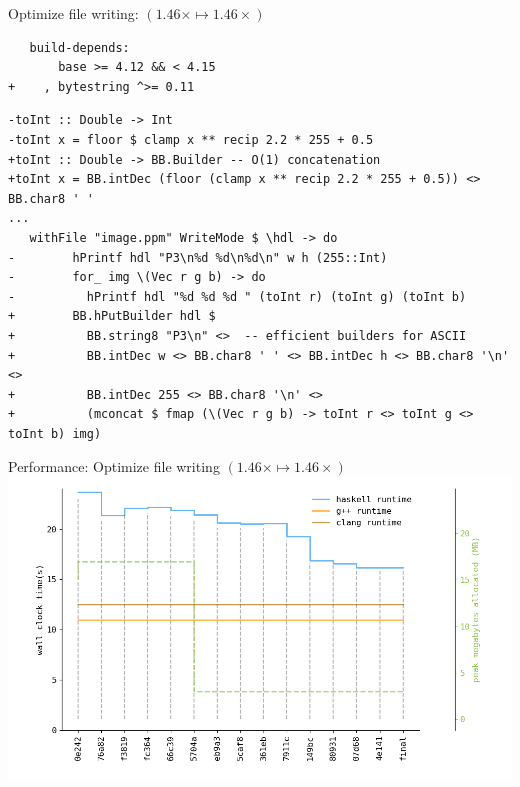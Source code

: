 \documentclass[8pt]{beamer}
\begin{document}
\begin{frame}[fragile]{Optimize file writing: $(1.46\times \mapsto 1.46\times)$}
\begin{verbatim}
   build-depends:
       base >= 4.12 && < 4.15
+    , bytestring ^>= 0.11
\end{verbatim}
\begin{verbatim}
-toInt :: Double -> Int
-toInt x = floor $ clamp x ** recip 2.2 * 255 + 0.5
+toInt :: Double -> BB.Builder -- O(1) concatenation
+toInt x = BB.intDec (floor (clamp x ** recip 2.2 * 255 + 0.5)) <> BB.char8 ' '
... 
   withFile "image.ppm" WriteMode $ \hdl -> do
-        hPrintf hdl "P3\n%d %d\n%d\n" w h (255::Int)
-        for_ img \(Vec r g b) -> do
-          hPrintf hdl "%d %d %d " (toInt r) (toInt g) (toInt b)
+        BB.hPutBuilder hdl $
+          BB.string8 "P3\n" <>  -- efficient builders for ASCII
+          BB.intDec w <> BB.char8 ' ' <> BB.intDec h <> BB.char8 '\n' <>
+          BB.intDec 255 <> BB.char8 '\n' <>
+          (mconcat $ fmap (\(Vec r g b) -> toInt r <> toInt g <> toInt b) img)
\end{verbatim}


\end{frame}


\begin{frame}[fragile]{Performance: Optimize file writing $(1.46\times \mapsto  1.46\times)$}
\includegraphics[height=0.6\textwidth]{perfdata-upto-4e141-gen.png}
\end{frame}
\end{document}
